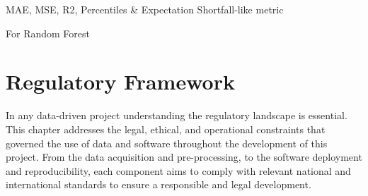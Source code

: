\documentclass[12pt]{report} %
\begin{document}
MAE, MSE, R2, Percentiles \& Expectation Shortfall-like metric

For Random Forest









\chapter{Regulatory Framework}

In any data-driven project understanding the regulatory landscape is essential. This chapter addresses the legal, ethical, and operational constraints that governed the use of data and software throughout the development of this project. From the data acquisition and pre-processing, to the software deployment and reproducibility, each component aims to comply with relevant national and international standards to ensure a responsible and legal development.
\end{document}
